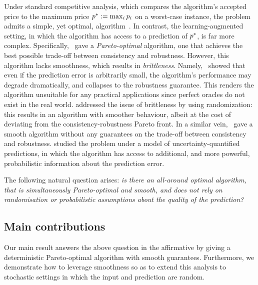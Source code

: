 Under standard competitive analysis, which compares the algorithm's accepted price
to the maximum price $p^*:=\max_i p_i$ on a worst-case instance, the problem admits a simple, yet optimal, algorithm~\citep{el-yaniv_competitive_1998}. In contrast, the learning-augmented setting, in which the algorithm has access to a prediction of $p^*$, is far more complex. Specifically,~\citet{sun_pareto-optimal_2021} gave a {\em Pareto-optimal} algorithm, \ie one that achieves the best possible trade-off between consistency and robustness. However, this algorithm lacks smoothness, which results in {\em brittleness}. Namely,~\citet{benomar2025tradeoffs} showed that even if the prediction error is arbitrarily small, the algorithm's performance may degrade dramatically, and collapses to the robustness guarantee. This renders the algorithm unsuitable for any practical applications since perfect oracles do not exist in the real world. \citet{benomar2025tradeoffs} addressed the issue of brittleness by using randomization: this results in an algorithm with smoother behaviour, albeit at the cost of deviating from the consistency-robustness Pareto front. In a similar vein,~\citet{DBLP:conf/aaai/0001KZ22} gave a smooth algorithm without any guarantees on the trade-off between consistency and robustness. \citet{DBLP:conf/icml/0004HCHWB24} studied the problem under a model of uncertainty-quantified predictions, in which the algorithm has access to additional, and more powerful, probabilistic information about the prediction error. 

The following natural question arises: 
{\em is there an all-around optimal algorithm, that is simultaneously Pareto-optimal and smooth, and does not rely on randomisation or probabilistic assumptions about the quality of the prediction?} 



\subsection{Main contributions}

Our main result answers the above question in the affirmative by giving a deterministic Pareto-optimal algorithm with smooth guarantees. Furthermore, we demonstrate how to leverage smoothness so as to extend this analysis to stochastic settings in which the input and  prediction are random.

